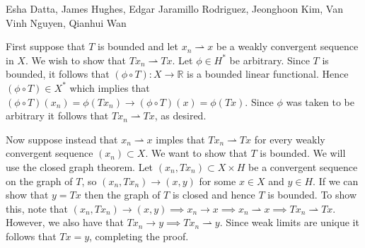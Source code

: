 

\begin{solution}{Esha Datta, James Hughes, Edgar Jaramillo Rodriguez, Jeonghoon Kim, Van Vinh Nguyen, Qianhui Wan}

        First suppose that $T$ is bounded and let $x_n \rightharpoonup x$ be a weakly convergent sequence in $X$.
        We wish to show that $Tx_n \rightharpoonup Tx$.
        Let $\phi \in H^*$ be arbitrary.
        Since $T$ is bounded, it follows that $(\phi \circ T): X \to \mathbb R$ is a bounded linear functional.
        Hence $(\phi \circ T) \in X^*$ which implies that $(\phi \circ T)(x_n) = \phi(Tx_n) \rightarrow (\phi \circ T)(x) = \phi(Tx)$.
        Since $\phi$ was taken to be arbitrary it follows that $Tx_n \rightharpoonup Tx$, as desired. 

        Now suppose instead that  $x_n \rightharpoonup x$ imples that $Tx_n \rightharpoonup Tx$ for every weakly convergent sequence $(x_n) \subset X$.
        We want to show that $T$ is bounded.
        We will use the closed graph theorem.
        Let $(x_n, Tx_n) \subset X \times H$ be a convergent sequence on the graph of $T$, so $(x_n, Tx_n) \to (x,y)$ for some $x\in X$ and $y \in H$.
        If we can show that $y= Tx$ then the graph of $T$ is closed and hence $T$ is bounded.
        To show this, note that $(x_n, Tx_n) \to (x,y) \implies x_n \to x \implies x_n \rightharpoonup x \implies Tx_n \rightharpoonup Tx$.
        However, we also have that $Tx_n \to y \implies Tx_n \rightharpoonup y$.
        Since weak limits are unique it follows that $Tx =y$, completing the proof.
\end{solution}


